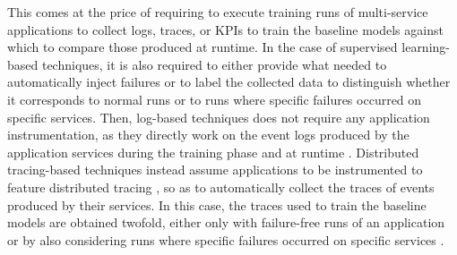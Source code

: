 This comes at the price of requiring to execute training runs of multi-service applications to collect logs, traces, or KPIs to train the baseline models against which to compare those produced at runtime. 
In the case of supervised learning-based techniques, it is also required to either provide what needed to automatically inject failures or to label the collected data to distinguish whether it corresponds to normal runs or to runs where specific failures occurred on specific services.
Then, log-based techniques does not require any application instrumentation, as they directly work on the event logs produced by the application services during the training phase and at runtime \cite{38_Nandi2016_AnomalyDetectionControlFlowGraphMining,31_Jia2017_AnomalyDiagnosisHybridGraphModel,32_Jia2017_LogSed}.
%
Distributed tracing-based techniques instead assume applications to be instrumented to feature distributed tracing \cite{Richardson2018_MicroservicesPatterns}, so as to automatically collect the traces of events produced by their services.
In this case, the traces used to train the baseline models are obtained twofold, \viz either only with failure-free runs of an application  \cite{16_Liu2020_TraceAnomaly,35_Nedelkoski2019_AnomalyDetectionTracingData,22_Jin2020_AnomalyDetectionMicroservicesRPCA,36_Bogatinovski2020_SelfSupervisedAnomalyDetection} or by also considering runs where specific failures occurred on specific services \cite{17_Gan2019_Seer,34_Nedelkoski2019_AnomalyDetectionDistributedTracing,02_Zhou2019_LatentErrorPrediction}.

